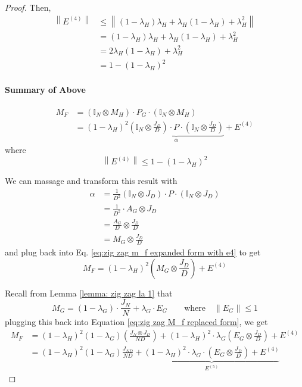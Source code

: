 \documentclass[11pt, letter]{book}
\newcommand{\norm}[1]{\left\lVert#1\right\rVert}
\begin{document}
\begin{proof}
	Then, 
	\begin{align}
		\norm{E^{(4)}} 
		&\leq \norm{ (1 - \lambda_H) \lambda_H + \lambda_H (1 - \lambda_H) + \lambda_H ^2} \\
		&= (1 - \lambda_H) \lambda_H + \lambda_H (1 - \lambda_H) + \lambda_H ^2 \\ 
		&= 2 \lambda_H (1 - \lambda_H) + \lambda_H^2 \\
		&= 1 - (1 - \lambda_H)^2
	\end{align}
	\begin{mdframed}
		\paragraph{Summary of Above}
		\begin{align}
			M_F
			&= (\mathbb I _N \otimes M_H ) \cdot P_G \cdot ( \mathbb I _ N \otimes M_H ) \\
			&= (1 - \lambda_H)^2 \underbrace{\left( \mathbb I _N \otimes \frac{J_D}{D} \right) \cdot P \cdot \left( \mathbb I _N \otimes \frac{J_D}{D} \right)}_{\alpha} + E^{(4)} \label{eq:zig zag m_f expanded form with e4}
		\end{align}
		where 
		\begin{equation}
			\norm{E^{(4)}} \leq 1 - (1 - \lambda_H) ^2
		\end{equation}
	\end{mdframed}
	
	We can massage and transform this result with 
	\begin{align}
		\alpha 
		&= \frac{1}{D^2} ( \mathbb I _N \otimes J_D ) \cdot P \cdot ( \mathbb I _N \otimes J_D )  \\
		&= \frac{1}{D^2} \cdot A_G \otimes J_D \\
		&= \frac{A_G}{D} \otimes \frac{J_D}{D} \\
		&= M_G \otimes \frac{J_D}{D}
	\end{align}
	and plug back into Eq. \ref{eq:zig zag m_f expanded form with e4} to get
	\begin{equation}
		M_F = (1 - \lambda_H)^2 \left( M_G \otimes \frac{J_D}{D} \right ) + E^{(4)} \label{eq:zig zag M_f replaced form}
	\end{equation}
	
	Recall from Lemma \ref{lemma: zig zag la 1} that
	\begin{equation}
		M_G = (1 - \lambda_G) \cdot \frac{J_N}{N} + \lambda_G \cdot E_G \quad \quad \text{where} \quad \norm{E_G} \leq 1
	\end{equation}
	plugging this back into Equation \ref{eq:zig zag M_f replaced form}, we get 
	\begin{align}
		M_F
		&= (1 - \lambda_H) ^ 2 (1 - \lambda_G) \left( \frac{J_N \otimes J_D}{ND} \right) + (1 - \lambda_H ) ^2 \cdot \lambda_G \left( E_G \otimes \frac{J_D}{D} \right) + E^{(4)} \\
		&= (1 - \lambda_H)^2 (1 - \lambda_G) \frac{J_{ND}}{ND} + \underbrace{(1 - \lambda_H)^2 \cdot \lambda_G \cdot \left( E_G \otimes \frac{J_D}{D} \right) + E^{(4)}}_{E^{(5)}}
	\end{align}
	

\end{proof}
\end{document}
